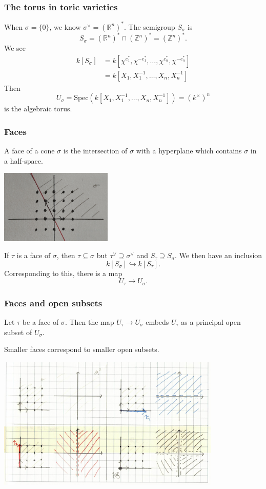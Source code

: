 \documentclass{beamer}
\theoremstyle{definition}
\theoremstyle{definition}
\begin{document}
\begin{frame}
\frametitle{The torus in toric varieties}
When $\sigma = \{0\}$, we know $\sigma^\vee = (\mathbb{R}^n)^*$.
The semigroup $S_\sigma$ is
$$S_\sigma = (\mathbb{R}^n)^* \cap (\mathbb{Z}^n)^* = (\mathbb{Z}^n)^*.$$
We see
\begin{align*}
	k[S_\sigma] &= k[\chi^{e_1^*}, \chi^{-e_1^*}, \ldots, \chi^{e_n^*}, \chi^{-e_n^*}] \\
		&= k[X_1, X_1^{-1}, \ldots, X_n, X_n^{-1}]
\end{align*}
Then
$$U_\sigma = \mathrm{Spec}(k[X_1, X_1^{-1}, \ldots, X_n, X_n^{-1}]) = (k^\times)^n$$
is the \alert{algebraic torus}.
\end{frame}

\begin{frame}
\frametitle{Faces}
A \alert{face} of a cone  $\sigma$ is the intersection of $\sigma$ with a hyperplane which contains $\sigma$ in a half-space.

\centerline{\includegraphics[width=0.4\textwidth]{face}}

If $\tau$ is a face of $\sigma$, then $\tau \subseteq \sigma$ but $\tau^\vee \supseteq \sigma^\vee$ and $S_\tau \supseteq S_\sigma$.
We then have an inclusion 
$$k[S_\sigma] \hookrightarrow k[S_\tau].$$
Corresponding to this, there is a map
$$U_\tau \to U_\sigma.$$
\end{frame}

\begin{frame}
\frametitle{Faces and open subsets}
\begin{theorem}
Let $\tau$ be a face of $\sigma$.
Then the map $U_\tau \to U_\sigma$ embeds $U_\tau$ as a principal open subset of $U_\sigma$.
\end{theorem}

Smaller faces correspond to smaller open subsets.

\centerline{\includegraphics[width=0.8\textwidth]{faces_and_open_sets}}
\end{frame}
\end{document}
